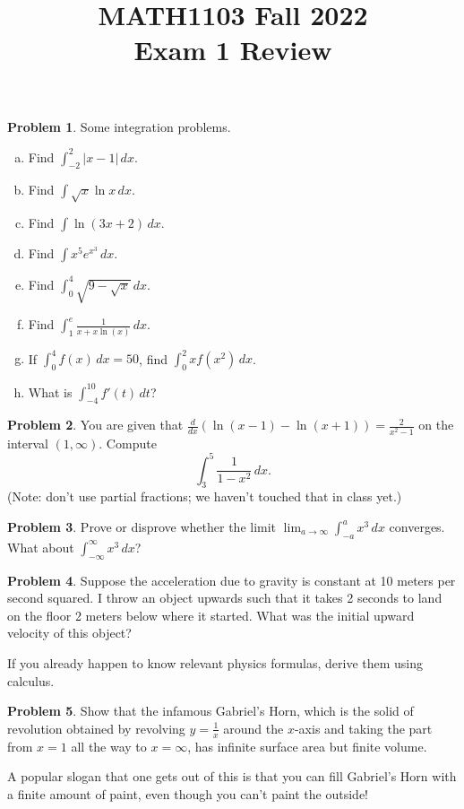 \documentclass[11pt,oneside]{amsart}
\title{MATH1103 Fall 2022\\
Exam 1 Review}
\theoremstyle{definition}
\newtheorem{problem}{Problem}
\begin{document}
\maketitle

\begin{problem}
Some integration problems.
\begin{enumerate}[(a)]
    \item Find $\displaystyle\int_{-2}^2|x-1|\,dx$.
    \item Find $\int \sqrt x\ln x\,dx$.
    \item Find $\int \ln(3x+2)\,dx$.
    \item Find $\displaystyle\int x^5e^{x^3}\,dx$.
    \item Find $\displaystyle\int_0^4\sqrt{9-\sqrt x}\,dx$.
    \item Find $\displaystyle\int_1^e\frac 1{x+x\ln(x)}\,dx$.
    \item If $\displaystyle\int_0^4 f(x)\,dx=50$, find $\displaystyle\int_0^2 xf(x^2)\,dx$.
    \item What is $\displaystyle\int_{-4}^{10}f'(t)\,dt$?
\end{enumerate}
\end{problem}

\begin{problem}
You are given that $\frac d{dx}(\ln(x-1)-\ln(x+1))=\frac 2{x^2-1}$ on the interval $(1,\infty)$. Compute
\[\int_3^5\frac 1{1-x^2}\,dx.\]
(Note: don't use partial fractions; we haven't touched that in class yet.)
\end{problem}

\begin{problem}
Prove or disprove whether the limit $\lim_{a\to\infty}\int_{-a}^a x^3\,dx$ converges. What about $\int_{-\infty}^\infty x^3\,dx$?
\end{problem}

\begin{problem}
Suppose the acceleration due to gravity is constant at 10 meters per second squared. I throw an object upwards such that it takes 2 seconds to land on the floor 2 meters below where it started. What was the initial upward velocity of this object?

If you already happen to know relevant physics formulas, derive them using calculus.
\end{problem}

\begin{problem}
Show that the infamous Gabriel's Horn, which is the solid of revolution obtained by revolving $y=\frac 1x$ around the $x$-axis and taking the part from $x=1$ all the way to $x=\infty$, has infinite surface area but finite volume.

A popular slogan that one gets out of this is that you can fill Gabriel's Horn with a finite amount of paint, even though you can't paint the outside!
\end{problem}
\end{document}
